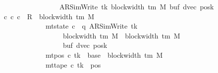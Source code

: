 \begin{isabellebody}
\ \ \ \ \ \ \ \ \ \ \ \ \ \ \ \ \ \ \ {\isacharparenleft}{\kern0pt}AR{\isacharunderscore}{\kern0pt}SimWrite{\isacharcomma}{\kern0pt}\ tk{\isacharcomma}{\kern0pt}\ block{\isacharunderscore}{\kern0pt}width\ {\isacharparenleft}{\kern0pt}{\isasymGamma}{\isacharunderscore}{\kern0pt}tm\ M{\isacharparenright}{\kern0pt}{\isacharcomma}{\kern0pt}\ buf{\isacharcomma}{\kern0pt}\ dvec{\isacharcomma}{\kern0pt}\ posk{\isacharparenright}{\kern0pt}{\isachardoublequoteclose}\isanewline
\ \ \ {\isachardoublequoteopen}{\isasymexists}c{\isacharprime}{\kern0pt}{\isachardot}{\kern0pt}\ {\isacharparenleft}{\kern0pt}c{}{\isacharcomma}{\kern0pt}\ c{\isacharprime}{\kern0pt}{\isacharparenright}{\kern0pt}\ {\isasymin}\ R{\isacharprime}{\kern0pt}\ {\isacharcircum}{\kern0pt}{\isacharcircum}{\kern0pt}\ {\isacharparenleft}{\kern0pt}block{\isacharunderscore}{\kern0pt}width\ {\isacharparenleft}{\kern0pt}{\isasymGamma}{\isacharunderscore}{\kern0pt}tm\ M{\isacharparenright}{\kern0pt}\ {\isacharminus}{\kern0pt}\ {}{\isacharparenright}{\kern0pt}\isanewline
\ \ \ \ \ \ \ \ \ \ \ \ \ \ {\isasymand}\ mt{\isacharunderscore}{\kern0pt}state\ c{\isacharprime}{\kern0pt}\ {\isacharequal}{\kern0pt}\ {\isacharparenleft}{\kern0pt}q{\isacharcomma}{\kern0pt}\ AR{\isacharunderscore}{\kern0pt}SimWrite{\isacharcomma}{\kern0pt}\ tk{\isacharcomma}{\kern0pt}\isanewline
\ \ \ \ \ \ \ \ \ \ \ \ \ \ \ \ \ \ \ \ block{\isacharunderscore}{\kern0pt}width\ {\isacharparenleft}{\kern0pt}{\isasymGamma}{\isacharunderscore}{\kern0pt}tm\ M{\isacharparenright}{\kern0pt}\ {\isacharplus}{\kern0pt}\ {\isacharparenleft}{\kern0pt}block{\isacharunderscore}{\kern0pt}width\ {\isacharparenleft}{\kern0pt}{\isasymGamma}{\isacharunderscore}{\kern0pt}tm\ M{\isacharparenright}{\kern0pt}\ {\isacharminus}{\kern0pt}\ {}{\isacharparenright}{\kern0pt}{\isacharcomma}{\kern0pt}\isanewline
\ \ \ \ \ \ \ \ \ \ \ \ \ \ \ \ \ \ \ \ buf{\isacharcomma}{\kern0pt}\ dvec{\isacharcomma}{\kern0pt}\ posk{\isacharparenright}{\kern0pt}\isanewline
\ \ \ \ \ \ \ \ \ \ \ \ \ \ {\isasymand}\ mt{\isacharunderscore}{\kern0pt}pos\ c{\isacharprime}{\kern0pt}\ tk\ {\isacharequal}{\kern0pt}\ base\ {\isacharplus}{\kern0pt}\ {\isacharparenleft}{\kern0pt}block{\isacharunderscore}{\kern0pt}width\ {\isacharparenleft}{\kern0pt}{\isasymGamma}{\isacharunderscore}{\kern0pt}tm\ M{\isacharparenright}{\kern0pt}\ {\isacharminus}{\kern0pt}\ {}{\isacharparenright}{\kern0pt}\isanewline
\ \ \ \ \ \ \ \ \ \ \ \ \ \ {\isasymand}\ mt{\isacharunderscore}{\kern0pt}tape\ c{\isacharprime}{\kern0pt}\ tk\ {\isacharequal}{\kern0pt}\ {\isacharparenleft}{\kern0pt}{\isasymlambda}pos{\isachardot}{\kern0pt}\isanewline

\end{isabellebody}

